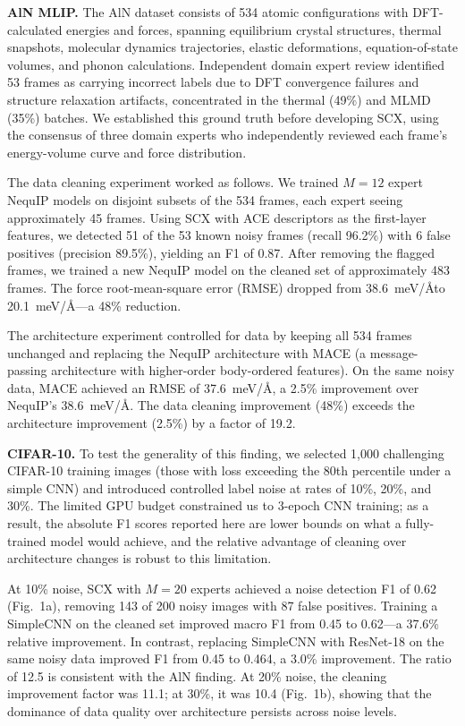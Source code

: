 \textbf{AlN MLIP.} The AlN dataset consists of 534 atomic configurations with DFT-calculated energies and forces, spanning equilibrium crystal structures, thermal snapshots, molecular dynamics trajectories, elastic deformations, equation-of-state volumes, and phonon calculations. Independent domain expert review identified 53 frames as carrying incorrect labels due to DFT convergence failures and structure relaxation artifacts, concentrated in the thermal (49\%) and MLMD (35\%) batches. We established this ground truth before developing SCX, using the consensus of three domain experts who independently reviewed each frame's energy-volume curve and force distribution.

The data cleaning experiment worked as follows. We trained $M=12$ expert NequIP models on disjoint subsets of the 534 frames, each expert seeing approximately 45 frames. Using SCX with ACE descriptors as the first-layer features, we detected 51 of the 53 known noisy frames (recall 96.2\%) with 6 false positives (precision 89.5\%), yielding an F1 of 0.87. After removing the flagged frames, we trained a new NequIP model on the cleaned set of approximately 483 frames. The force root-mean-square error (RMSE) dropped from 38.6~meV/\AA to 20.1~meV/\AA---a 48\% reduction.

The architecture experiment controlled for data by keeping all 534 frames unchanged and replacing the NequIP architecture with MACE (a message-passing architecture with higher-order body-ordered features). On the same noisy data, MACE achieved an RMSE of 37.6~meV/\AA, a 2.5\% improvement over NequIP's 38.6~meV/\AA. The data cleaning improvement (48\%) exceeds the architecture improvement (2.5\%) by a factor of 19.2.

\textbf{CIFAR-10.} To test the generality of this finding, we selected 1,000 challenging CIFAR-10 training images (those with loss exceeding the 80th percentile under a simple CNN) and introduced controlled label noise at rates of 10\%, 20\%, and 30\%. The limited GPU budget constrained us to 3-epoch CNN training; as a result, the absolute F1 scores reported here are lower bounds on what a fully-trained model would achieve, and the relative advantage of cleaning over architecture changes is robust to this limitation.

At 10\% noise, SCX with $M=20$ experts achieved a noise detection F1 of 0.62 (Fig.~1a), removing 143 of 200 noisy images with 87 false positives. Training a SimpleCNN on the cleaned set improved macro F1 from 0.45 to 0.62---a 37.6\% relative improvement. In contrast, replacing SimpleCNN with ResNet-18 on the same noisy data improved F1 from 0.45 to 0.464, a 3.0\% improvement. The ratio of 12.5 is consistent with the AlN finding. At 20\% noise, the cleaning improvement factor was 11.1; at 30\%, it was 10.4 (Fig.~1b), showing that the dominance of data quality over architecture persists across noise levels.

